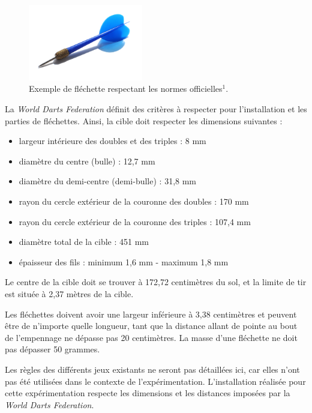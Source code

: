 \begin{figure}
    \centering
    \includegraphics[width=5cm]{pictures/dart.jpg}
    \caption[Fléchette]{Exemple de fléchette respectant les normes officielles$^1$.}
    \label{fig:single_dart}
\end{figure}



La \textit{World Darts Federation} définit des critères à respecter pour l'installation et les parties de fléchettes. Ainsi, la cible doit respecter les dimensions suivantes :
\begin{itemize}
\item largeur intérieure des doubles et des triples : 8 mm
\item diamètre du centre (bulle) : 12,7 mm
\item diamètre du demi-centre (demi-bulle) : 31,8 mm
\item rayon du cercle extérieur de la couronne des doubles : 170 mm
\item rayon du cercle extérieur de la couronne des triples : 107,4 mm
\item diamètre total de la cible : 451 mm
\item épaisseur des fils : minimum 1,6 mm - maximum 1,8 mm
\end{itemize}

Le centre de la cible doit se trouver à 172,72 centimètres du sol, et la limite de tir est située à 2,37 mètres de la cible.

Les fléchettes doivent avoir une largeur inférieure à 3,38 centimètres et peuvent être de n'importe quelle longueur, tant que la distance allant de pointe au bout de l'empennage ne dépasse pas 20 centimètres. La masse d'une fléchette ne doit pas dépasser 50 grammes.

Les règles des différents jeux existants ne seront pas détaillées ici, car elles n'ont pas été utilisées dans le contexte de l'expérimentation. L'installation réalisée pour cette expérimentation respecte les dimensions et les distances imposées par la \textit{World Darts Federation}.


